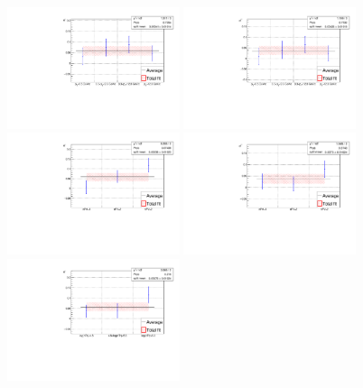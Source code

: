 \begin{figure}[htpb]
        \begin{center}
                \includegraphics[width=0.45\textwidth]{05DecaytimeFit/figs/splits/Sf_splits_BPT.pdf}
                \includegraphics[width=0.45\textwidth]{05DecaytimeFit/figs/splits/Sfbar_splits_BPT.pdf} \\
                \includegraphics[width=0.45\textwidth]{05DecaytimeFit/figs/splits/Sf_splits_nPV.pdf}
                \includegraphics[width=0.45\textwidth]{05DecaytimeFit/figs/splits/Sfbar_splits_nPV.pdf} \\
                \includegraphics[width=0.45\textwidth]{05DecaytimeFit/figs/splits/Sf_splits_nTracks.pdf}

\end{center}
\end{figure}
